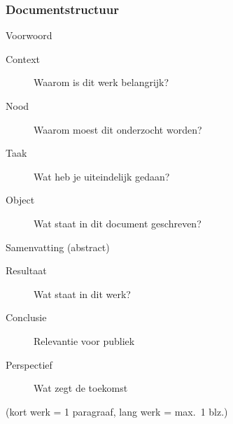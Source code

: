 \documentclass[aspectratio=169]{beamer}
\begin{document}
\begin{frame}
  \frametitle{Documentstructuur}
  
  Voorwoord
  
  \begin{description}
    \item[Context] Waarom is dit werk belangrijk?
    \item[Nood] Waarom moest dit onderzocht worden?
    \item[Taak] Wat heb je uiteindelijk gedaan?
    \item[Object] Wat staat in dit document geschreven?
  \end{description}
  
  Samenvatting (abstract)
  
  \begin{description}
    \item[Resultaat] Wat staat in dit werk?
    \item[Conclusie] Relevantie voor publiek
    \item[Perspectief] Wat zegt de toekomst
  \end{description}
  
  (kort werk = 1 paragraaf, lang werk = max.~1 blz.)
\end{frame}
\end{document}
